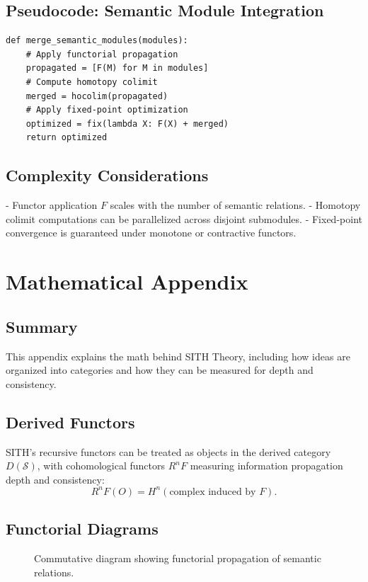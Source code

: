 \documentclass[11pt,oneside]{memoir}
\theoremstyle{plain}
\newcommand{\Sfun}{\mathcal{S}}
\begin{document}
\subsection{Pseudocode: Semantic Module Integration}
\begin{lstlisting}
def merge_semantic_modules(modules):
    # Apply functorial propagation
    propagated = [F(M) for M in modules]
    # Compute homotopy colimit
    merged = hocolim(propagated)
    # Apply fixed-point optimization
    optimized = fix(lambda X: F(X) + merged)
    return optimized
\end{lstlisting}

\subsection{Complexity Considerations}
- Functor application \(F\) scales with the number of semantic relations.
- Homotopy colimit computations can be parallelized across disjoint submodules.
- Fixed-point convergence is guaranteed under monotone or contractive functors.

\section{Mathematical Appendix}
\subsection{Summary}
This appendix explains the math behind SITH Theory, including how ideas are organized into categories and how they can be measured for depth and consistency.

\subsection{Derived Functors}
SITH’s recursive functors can be treated as objects in the derived category \(D(\Sfun)\), with cohomological functors \(R^n F\) measuring information propagation depth and consistency:
\begin{equation}
    R^n F(O) = H^n(\text{complex induced by } F).
\end{equation}

\subsection{Functorial Diagrams}
\begin{figure}[h]
\centering
{}
\caption{Commutative diagram showing functorial propagation of semantic relations.}
\label{fig:sith_functor}
\end{figure}
\end{document}
